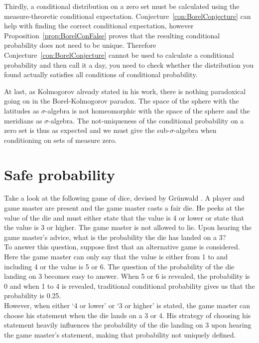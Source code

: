 \documentclass[a4paper]{report}
\theoremstyle{plain}
\theoremstyle{definition}
\theoremstyle{remark}
\numberwithin{equation}{chapter}
\DeclareMathOperator{\1}{\mathbbm{1}}
\begin{document}
Thirdly, a conditional distribution on a zero set must be calculated using the measure-theoretic conditional expectation. Conjecture~\ref{con:BorelConjecture} can help with finding the correct conditional expectation, however Proposition~\ref{prop:BorelConFalse} proves that the resulting conditional probability does not need to be unique. Therefore Conjecture~\ref{con:BorelConjecture} cannot be used to calculate a conditional probability and then call it a day, you need to check whether the distribution you found actually satisfies all conditions of conditional probability.

At last, as Kolmogorov \cite{Kolmogorov33} already stated in his work, there is nothing paradoxical going on in the Borel-Kolmogorov paradox. The space of the sphere with the latitudes as $\sigma$-algebra is not homeomorphic with the space of the sphere and the meridians as $\sigma$-algebra. The not-uniqueness of the conditional probability on a zero set is thus as expected and we must give the sub-$\sigma$-algebra when conditioning on sets of measure zero.


\chapter{Safe probability}\label{chap:SafeProp}
Take a look at the following game of dice, devised by Grünwald \cite{Grunwald13}. A player and game master are present and the game master casts a fair die. He peeks at the value of the die and must either state that the value is 4 or lower or state that the value is 3 or higher. The game master is not allowed to lie. Upon hearing the game master's advice, what is the probability the die has landed on a 3?\\
To answer this question, suppose first that an alternative game is considered. Here the game master can only say that the value is either from 1 to and including 4 or the value is 5 or 6. The question of the probability of the die landing on 3 becomes easy to answer. When 5 or 6 is revealed, the probability is 0 and when 1 to 4 is revealed, traditional conditional probability gives us that the probability is 0.25.\\
However, when either `4 or lower' or `3 or higher' is stated, the game master can choose his statement when the die lands on a 3 or 4. His strategy of choosing his statement heavily influences the probability of the die landing on 3 upon hearing the game master's statement, making that probability not uniquely defined.
\end{document}
